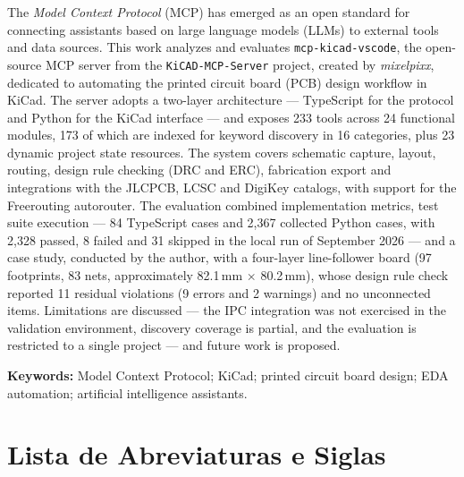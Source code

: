\noindent
The \emph{Model Context Protocol} (MCP) has emerged as an open standard for
connecting assistants based on large language models (LLMs) to external tools
and data sources. This work analyzes and evaluates \texttt{mcp-kicad-vscode},
the open-source MCP server from the \texttt{KiCAD-MCP-Server} project, created
by \emph{mixelpixx}, dedicated to automating the printed
circuit board (PCB) design workflow in KiCad. The server adopts a two-layer
architecture --- TypeScript for the protocol and Python for the KiCad
interface --- and exposes 233 tools across 24 functional modules, 173 of which
are indexed for keyword discovery in 16 categories, plus 23 dynamic project
state resources. The system covers schematic capture, layout, routing, design
rule checking (DRC and ERC), fabrication export and integrations with the
JLCPCB, LCSC and DigiKey catalogs, with support for the Freerouting
autorouter. The evaluation combined implementation metrics, test suite
execution --- 84 TypeScript cases and 2,367 collected Python cases, with 2,328
passed, 8 failed and 31 skipped in the local run of September 2026 --- and a
case study, conducted by the author, with a four-layer line-follower board
(97 footprints, 83 nets, approximately 82.1\,mm $\times$ 80.2\,mm), whose design rule check reported 11
residual violations (9 errors and 2 warnings) and no unconnected items.
Limitations are discussed --- the IPC integration was not exercised in the
validation environment, discovery coverage is partial, and the evaluation is
restricted to a single project --- and future work is proposed.

\vspace{\baselineskip}
\noindent\textbf{Keywords:} Model Context Protocol; KiCad; printed circuit
board design; EDA automation; artificial intelligence assistants.

\chapter*{Lista de Abreviaturas e Siglas}

